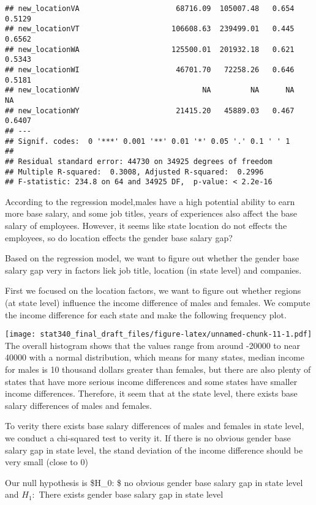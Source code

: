 \documentclass[
]{article}
\begin{document}
\begin{verbatim}
## new_locationVA                      68716.09  105007.48   0.654   0.5129    
## new_locationVT                     106608.63  239499.01   0.445   0.6562    
## new_locationWA                     125500.01  201932.18   0.621   0.5343    
## new_locationWI                      46701.70   72258.26   0.646   0.5181    
## new_locationWV                            NA         NA      NA       NA    
## new_locationWY                      21415.20   45889.03   0.467   0.6407    
## ---
## Signif. codes:  0 '***' 0.001 '**' 0.01 '*' 0.05 '.' 0.1 ' ' 1
## 
## Residual standard error: 44730 on 34925 degrees of freedom
## Multiple R-squared:  0.3008, Adjusted R-squared:  0.2996 
## F-statistic: 234.8 on 64 and 34925 DF,  p-value: < 2.2e-16
\end{verbatim}

According to the regression model,males have a high potential ability to
earn more base salary, and some job titles, years of experiences also
affect the base salary of employees. However, it seems like state
location do not effects the employees, so do location effects the gender
base salary gap?

Based on the regression model, we want to figure out whether the gender
base salary gap very in factors liek job title, location (in state
level) and companies.

First we focused on the location factors, we want to figure out whether
regions (at state level) influence the income difference of males and
females. We compute the income difference for each state and make the
following frequency plot.

\texttt{[image: stat340\_final\_draft\_files/figure-latex/unnamed-chunk-11-1.pdf]}
The overall histogram shows that the values range from around -20000 to
near 40000 with a normal distribution, which means for many states,
median income for males is 10 thousand dollars greater than females, but
there are also plenty of states that have more serious income
differences and some states have smaller income differences. Therefore,
it seem that at the state level, there exists base salary differences of
males and females.

To verity there exists base salary differences of males and females in
state level, we conduct a chi-squared test to verity it. If there is no
obvious gender base salary gap in state level, the stand deviation of
the income difference should be very small (close to 0)

Our null hypothesis is \$H\_0: \$ no obvious gender base salary gap in
state level and \(H_1:\) There exists gender base salary gap in state
level
\end{document}
